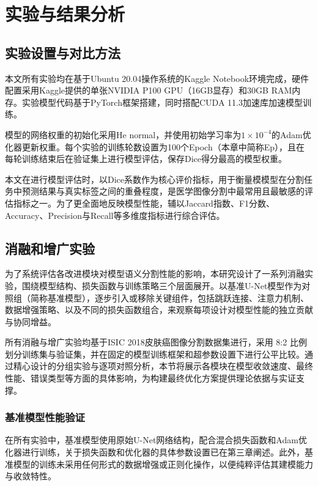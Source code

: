 \section{实验与结果分析}

\subsection{实验设置与对比方法}

本文所有实验均在基于Ubuntu 20.04操作系统的Kaggle Notebook环境完成，硬件配置采用Kaggle提供的单张NVIDIA P100 GPU（16GB显存）和30GB RAM内存。实验模型代码基于PyTorch框架搭建，同时搭配CUDA 11.3加速库加速模型训练。

模型的网络权重的初始化采用He normal，并使用初始学习率为$1 \times 10^{-4}$的Adam优化器更新权重。每个实验的训练轮数设置为100个Epoch（本章中简称Ep），且在每轮训练结束后在验证集上进行模型评估，保存Dice得分最高的模型权重。

本文在进行模型评估时，以Dice系数作为核心评价指标，用于衡量模模型在分割任务中预测结果与真实标签之间的重叠程度，是医学图像分割中最常用且最敏感的评估指标之一。为了更全面地反映模型性能，辅以Jaccard指数、F1分数、Accuracy、Precision与Recall等多维度指标进行综合评估。

\subsection{消融和增广实验}

为了系统评估各改进模块对模型语义分割性能的影响，本研究设计了一系列消融实验，围绕模型结构、损失函数与训练策略三个层面展开。以基准U-Net模型作为对照组（简称基准模型），逐步引入或移除关键组件，包括跳跃连接、注意力机制、数据增强策略、以及不同的损失函数组合，来观察每项设计对模型性能的独立贡献与协同增益。

所有消融与增广实验均基于ISIC 2018皮肤癌图像分割数据集进行，采用 8:2 比例划分训练集与验证集，并在固定的模型训练框架和超参数设置下进行公平比较。通过精心设计的分组实验与逐项对照分析，本节将展示各模块在模型收敛速度、最终性能、错误类型等方面的具体影响，为构建最终优化方案提供理论依据与实证支撑。

\subsubsection{基准模型性能验证}

在所有实验中，基准模型使用原始U-Net网络结构，配合混合损失函数和Adam优化器进行训练，关于损失函数和优化器的具体参数设置已在第三章阐述。此外，基准模型的训练未采用任何形式的数据增强或正则化操作，以便纯粹评估其建模能力与收敛特性。

